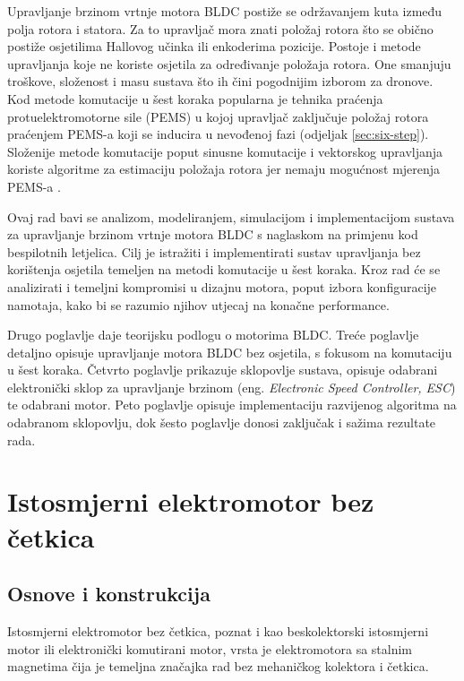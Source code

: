 \documentclass[diplomskirad]{fer}
\begin{document}
Upravljanje brzinom vrtnje motora BLDC postiže se održavanjem kuta između polja
rotora i statora. Za to upravljač mora znati položaj rotora što se obično
postiže osjetilima Hallovog učinka ili enkoderima pozicije. Postoje i metode
upravljanja koje ne koriste osjetila za određivanje položaja rotora. One
smanjuju troškove, složenost i masu sustava što ih čini pogodnijim izborom za
dronove. Kod metode komutacije u šest koraka popularna je tehnika praćenja
protuelektromotorne sile (PEMS) u kojoj upravljač zaključuje položaj rotora
praćenjem PEMS-a koji se inducira u nevođenoj fazi (odjeljak
\ref{sec:six-step}). Složenije metode komutacije poput sinusne komutacije i
vektorskog upravljanja koriste algoritme za estimaciju položaja rotora jer
nemaju mogućnost mjerenja PEMS-a \cite{NXP_AN2355}.

Ovaj rad bavi se analizom, modeliranjem, simulacijom i implementacijom sustava
za upravljanje brzinom vrtnje motora BLDC s naglaskom na primjenu kod
bespilotnih letjelica. Cilj je istražiti i implementirati sustav upravljanja
bez korištenja osjetila temeljen na metodi komutacije u šest koraka. Kroz
rad će se analizirati i temeljni kompromisi u dizajnu motora, poput izbora
konfiguracije namotaja, kako bi se razumio njihov utjecaj na konačne
performance.

Drugo poglavlje daje teorijsku podlogu o motorima BLDC. Treće poglavlje
detaljno opisuje upravljanje motora BLDC bez osjetila, s fokusom na komutaciju
u šest koraka. Četvrto poglavlje prikazuje sklopovlje sustava, opisuje odabrani
elektronički sklop za upravljanje brzinom (eng. \textit{Electronic Speed
	Controller, ESC}) te odabrani motor. Peto poglavlje opisuje implementaciju
razvijenog algoritma na odabranom sklopovlju, dok šesto poglavlje donosi zaključak i sažima rezultate rada.
\chapter{Istosmjerni elektromotor bez četkica}
\label{pog:bldc}
\section{Osnove i konstrukcija}
\label{sec:bldc:uvod}

Istosmjerni elektromotor bez četkica, poznat i kao beskolektorski istosmjerni
motor ili elektronički komutirani motor, vrsta je elektromotora sa stalnim
magnetima čija je temeljna značajka rad bez mehaničkog kolektora i četkica.
\end{document}

